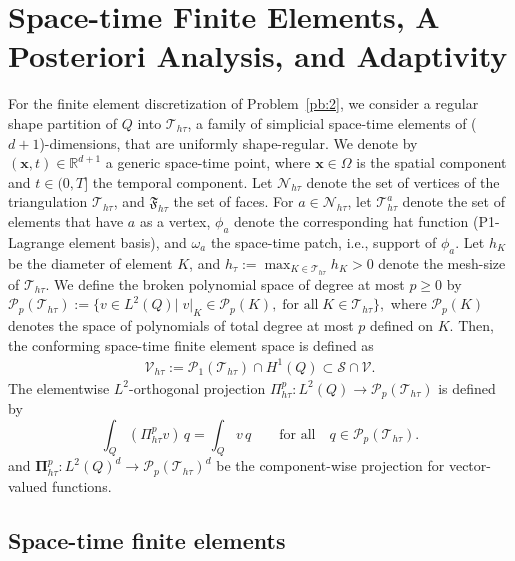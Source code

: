 \documentclass[review,11pt]{article}
\numberwithin{equation}{section}
\def \oma {\omega_a}
\def \t  {\tau}
\def \htt {{h\tau}}
\def \calV {\mathcal{V}}
\def \calP {\mathcal{P}}
\def \calS {\mathcal{S}}
\def \calT {\mathcal{T}}
\begin{document}
\section{Space-time Finite Elements, A Posteriori Analysis, and Adaptivity}\label{sec:apost}
For the finite element discretization of Problem~\ref{pb:2}, we consider a regular shape partition of $Q$ into  $\mathcal{T}_{h\tau}$, a family of simplicial space-time elements of ( $d+1$)-dimensions, that are uniformly shape-regular. We denote by $(\boldsymbol{x},t) \in \mathbb{R}^{d+1}$ a generic space-time point, where $\boldsymbol{x} \in \Omega$ is the spatial component and $t\in(0,T]$ the temporal component.  Let $\mathcal{N}_{h\tau}$ denote the set of vertices of the triangulation $\mathcal{T}_{h\tau}$, and $\mathfrak{F}_\htt$ the set of faces. For  $a\in \mathcal{N}_{h\t}$, let $\calT_\htt^a$ denote the set of elements that have $a$ as a vertex, $\phi_a$ denote the corresponding hat function (P1-Lagrange element basis), and $\oma$ the space-time patch, i.e., support of $\phi_a$. Let $h_K$ be the diameter of element $K$, and $h_\t:=\max_{K\in \calT_{h\t}} h_K>0$ denote the mesh-size of $\calT_\htt$. We define the broken polynomial space of degree at most $p \ge 0$ by $\mathcal P_p(\mathcal T_{h\tau}):=\{ v \in L^2(Q)|\; v|_K \in \mathcal P_p(K), \; \text{for all}\; K \in \mathcal T_{h\tau} \},$ where $\mathcal P_p(K)$ denotes the space of polynomials of total degree at most $p$ defined on $K$. Then, the conforming space-time finite element space is defined as
\begin{align}\label{eq:def_Vht}
    \calV_{h\t}:= \mathcal{P}_1(\calT_{h\t}) \cap H^1(Q)\subset \calS\cap \calV. 
\end{align}
The elementwise $L^2$-orthogonal projection $\Pi^p_{h\tau} : L^2(Q) \to \mathcal{P}_p(\mathcal{T}_{h\tau})$ is defined by
\begin{equation}\label{eq:L2_projection}
\int_Q (\Pi^p_{h\tau} v)\, q 
=
\int_Q v\, q 
\qquad \text{for all}\quad q \in \mathcal P_p(\calT_{h\t}).
\end{equation}
and $\bm{\Pi}^p_{h\t}: L^2(Q)^d\to \calP_p(\calT_{h\t})^d$ be the component-wise projection for vector-valued functions.
\subsection{Space-time finite elements}
\end{document}
